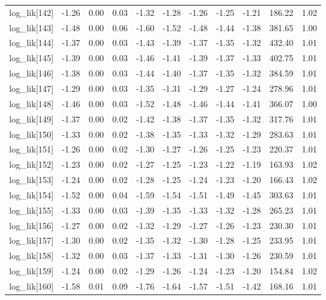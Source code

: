 \begin{table}[ht]
\begin{tabular}{rrrrrrrrrrr}
  log\_lik[142] & -1.26 & 0.00 & 0.03 & -1.32 & -1.28 & -1.26 & -1.25 & -1.21 & 186.22 & 1.02 \\ 
  log\_lik[143] & -1.48 & 0.00 & 0.06 & -1.60 & -1.52 & -1.48 & -1.44 & -1.38 & 381.65 & 1.00 \\ 
  log\_lik[144] & -1.37 & 0.00 & 0.03 & -1.43 & -1.39 & -1.37 & -1.35 & -1.32 & 432.40 & 1.01 \\ 
  log\_lik[145] & -1.39 & 0.00 & 0.03 & -1.46 & -1.41 & -1.39 & -1.37 & -1.33 & 402.75 & 1.01 \\ 
  log\_lik[146] & -1.38 & 0.00 & 0.03 & -1.44 & -1.40 & -1.37 & -1.35 & -1.32 & 384.59 & 1.01 \\ 
  log\_lik[147] & -1.29 & 0.00 & 0.03 & -1.35 & -1.31 & -1.29 & -1.27 & -1.24 & 278.96 & 1.01 \\ 
  log\_lik[148] & -1.46 & 0.00 & 0.03 & -1.52 & -1.48 & -1.46 & -1.44 & -1.41 & 366.07 & 1.00 \\ 
  log\_lik[149] & -1.37 & 0.00 & 0.02 & -1.42 & -1.38 & -1.37 & -1.35 & -1.32 & 317.76 & 1.01 \\ 
  log\_lik[150] & -1.33 & 0.00 & 0.02 & -1.38 & -1.35 & -1.33 & -1.32 & -1.29 & 283.63 & 1.01 \\ 
  log\_lik[151] & -1.26 & 0.00 & 0.02 & -1.30 & -1.27 & -1.26 & -1.25 & -1.23 & 220.37 & 1.01 \\ 
  log\_lik[152] & -1.23 & 0.00 & 0.02 & -1.27 & -1.25 & -1.23 & -1.22 & -1.19 & 163.93 & 1.02 \\ 
  log\_lik[153] & -1.24 & 0.00 & 0.02 & -1.28 & -1.25 & -1.24 & -1.23 & -1.20 & 166.43 & 1.02 \\ 
  log\_lik[154] & -1.52 & 0.00 & 0.04 & -1.59 & -1.54 & -1.51 & -1.49 & -1.45 & 303.63 & 1.01 \\ 
  log\_lik[155] & -1.33 & 0.00 & 0.03 & -1.39 & -1.35 & -1.33 & -1.32 & -1.28 & 265.23 & 1.01 \\ 
  log\_lik[156] & -1.27 & 0.00 & 0.02 & -1.32 & -1.29 & -1.27 & -1.26 & -1.23 & 230.30 & 1.01 \\ 
  log\_lik[157] & -1.30 & 0.00 & 0.02 & -1.35 & -1.32 & -1.30 & -1.28 & -1.25 & 233.95 & 1.01 \\ 
  log\_lik[158] & -1.32 & 0.00 & 0.03 & -1.37 & -1.33 & -1.31 & -1.30 & -1.26 & 230.59 & 1.01 \\ 
  log\_lik[159] & -1.24 & 0.00 & 0.02 & -1.29 & -1.26 & -1.24 & -1.23 & -1.20 & 154.84 & 1.02 \\ 
  log\_lik[160] & -1.58 & 0.01 & 0.09 & -1.76 & -1.64 & -1.57 & -1.51 & -1.42 & 168.16 & 1.01 \\ 

\end{tabular}
\end{table}
